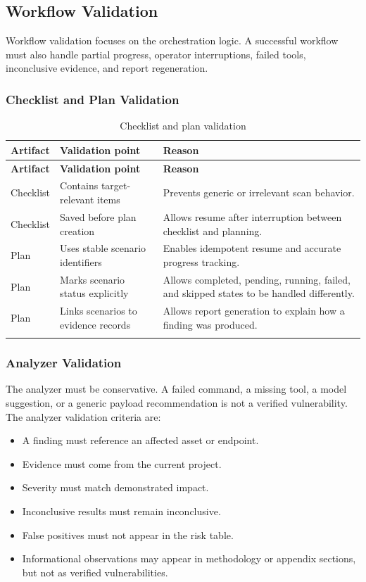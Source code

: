 \documentclass[12pt,a4paper]{report}
\begin{document}
\subsection{Workflow Validation}

Workflow validation focuses on the orchestration logic. A successful workflow must
also handle partial progress, operator interruptions, failed tools, inconclusive
evidence, and report regeneration.

\subsubsection{Checklist and Plan Validation}

\begin{longtable}{|p{}|p{}|p{}|}
\hline
\textbf{Artifact} & \textbf{Validation point} & \textbf{Reason} \\
\hline
\endfirsthead
\hline
\textbf{Artifact} & \textbf{Validation point} & \textbf{Reason} \\
\hline
\endhead
Checklist & Contains target-relevant items & Prevents generic or irrelevant scan
behavior. \\
\hline
Checklist & Saved before plan creation & Allows resume after interruption between
checklist and planning. \\
\hline
Plan & Uses stable scenario identifiers & Enables idempotent resume and accurate
progress tracking. \\
\hline
Plan & Marks scenario status explicitly & Allows completed, pending, running,
failed, and skipped states to be handled differently. \\
\hline
Plan & Links scenarios to evidence records & Allows report generation to explain
how a finding was produced. \\
\hline
\caption{Checklist and plan validation}
\label{tab:checklist_plan_validation}
\end{longtable}

\subsubsection{Analyzer Validation}

The analyzer must be conservative. A failed command, a missing tool, a model
suggestion, or a generic payload recommendation is not a verified vulnerability. The
analyzer validation criteria are:

\begin{itemize}
    \item A finding must reference an affected asset or endpoint.
    \item Evidence must come from the current project.
    \item Severity must match demonstrated impact.
    \item Inconclusive results must remain inconclusive.
    \item False positives must not appear in the risk table.
    \item Informational observations may appear in methodology or appendix sections,
    but not as verified vulnerabilities.
\end{itemize}
\end{document}
